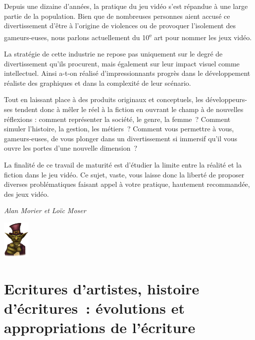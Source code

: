 \documentclass[
  10pt,
  french,
  a5paper,
  openany]{book}
\newenvironment{signature}{\begin{flushright}}{\end{flushright}}
\begin{document}

Depuis une dizaine d'années, la pratique du jeu vidéo s'est répandue à une large partie de la population. Bien que de nombreuses personnes aient accusé ce divertissement d'être à l'origine de violences ou de provoquer l'isolement des gameurs-euses, nous parlons actuellement du 10\textsuperscript{e} art pour nommer les jeux vidéo.

La stratégie de cette industrie ne repose pas uniquement sur le degré de divertissement qu'ils procurent, mais également sur leur impact visuel comme intellectuel. Ainsi a-t-on réalisé d'impressionnants progrès dans le développement réaliste des graphiques et dans la complexité de leur scénario.

Tout en laissant place à des produits originaux et conceptuels, les développeurs-ses tendent donc à mêler le réel à la fiction en ouvrant le champ à de nouvelles réflexions : comment représenter la société, le genre, la femme~? Comment simuler l'histoire, la gestion, les métiers~? Comment vous permettre à vous, gameurs-euses, de vous plonger dans un divertissement si immersif qu'il vous ouvre les portes d'une nouvelle dimension~?

\clearpage

La finalité de ce travail de maturité est d'étudier la limite entre la réalité et la fiction dans le jeu vidéo. Ce sujet, vaste, vous laisse donc la liberté de proposer diverses problématiques faisant appel à votre pratique, hautement recommandée, des jeux vidéo.

\begin{signature}
\emph{Alan Morier et Loïc Moser}

\end{signature}

\begin{flushright}
\includegraphics[width=\textwidth,height=5em]{images/le-jeu-video-fiction-ou-realite-2.jpg}

\end{flushright}

\hypertarget{ecritures-dartistes-histoire-duxe9critures-uxe9volutions-et-appropriations-de-luxe9criture}{%
\chapter{\texorpdfstring{Ecritures d'artistes, histoire d'écritures~: \linebreak évolutions et appropriations de l'écriture}{Ecritures d'artistes, histoire d'écritures~: évolutions et appropriations de l'écriture}}\label{ecritures-dartistes-histoire-duxe9critures-uxe9volutions-et-appropriations-de-luxe9criture}}
\end{document}

